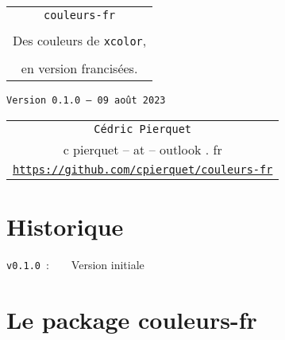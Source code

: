 \documentclass{article}
\def\TPversion{0.1.0}
\def\TPdate{09 août 2023}
\begin{document}
\pagestyle{fancy}

\thispagestyle{empty}

\vspace{2cm}

\begin{center}
	\begin{minipage}{0.75\linewidth}
	\begin{tcolorbox}[colframe=yellow,colback=yellow!15]
		\begin{center}
			\begin{tabular}{c}
				{\Huge \texttt{couleurs-fr}}\\
				\\
				{\LARGE Des couleurs de \texttt{xcolor},} \\
				\\
				{\LARGE en version francisées.} \\
			\end{tabular}
			
			\medskip
			
			{\small \texttt{Version \TPversion{} -- \TPdate}}
		\end{center}
	\end{tcolorbox}
\end{minipage}
\end{center}

\vspace{2.5mm}

\begin{center}
	\begin{tabular}{c}
	\texttt{Cédric Pierquet}\\
	{\ttfamily c pierquet -- at -- outlook . fr}\\
	\texttt{\url{https://github.com/cpierquet/couleurs-fr}}
\end{tabular}
\end{center}

\vspace{5mm}


\hypertarget{matoc}{}

\tableofcontents

\section{Historique}

\verb|v0.1.0|~:~~~~Version initiale

\section{Le package couleurs-fr}
\end{document}
